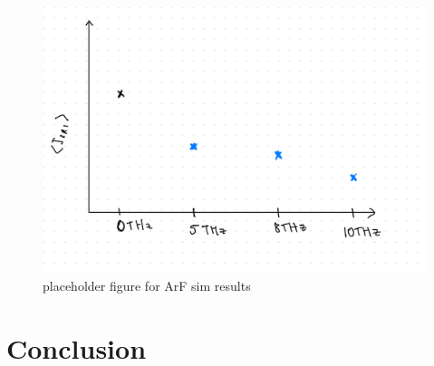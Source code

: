 \begin{figure}[ht]
   \centering
    \includegraphics[width=0.75\columnwidth]{Chapters/C5_broadband/arf_placeholder.jpeg}
    \caption{placeholder figure for ArF sim results}
    \label{fig:ArF}
\end{figure}{}


\section{Conclusion}


%
%
